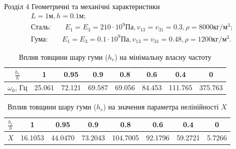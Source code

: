 \documentclass[8pt]{beamer}
\numberwithin{figure}{section}
\numberwithin{equation}{section}
\numberwithin{table}{section}
\begin{document}
\begin{frame}{Розділ 4}
Геометричні та механічні характеристики
\begin{equation}
\begin{gathered}
L=1\text{м}, h=0.1\text{м};\\
\text{Сталь:}\qquad
E_1=E_3=210\cdot 10^{9} Па, v_{13}=v_{31}=0.3, \rho=8000 кг/м^3;\\
\text{Гума:}\qquad
E_1=E_3=0.1\cdot 10^{9} Па, v_{13}=v_{31}=0.48, \rho=1200 кг/м^3.
\end{gathered}
\end{equation}

\begin{table}[h!]
\caption{Вплив товщини шару гуми ($h_{r}$) на мінімальну власну частоту}
\centering
 \begin{tabular}{| c | c | c | c | c | c | c | c |} 
 \hline
 $\displaystyle \frac{h_{r}}{h}$ & 1 & 0.95 & 0.9 & 0.8 & 0.6 & 0.4 & 0 \\ 
  \hline
 $\omega_0$, Гц & 25.061 & 72.121 & 69.587 & 69.056 & 84.453 & 111.765 & 375.763 \\
   \hline
\end{tabular}
\end{table}

\begin{table}[h!]
\caption{Вплив товщини шару гуми ($h_{r}$) на значення параметра нелінійності $X$}
\centering
 \begin{tabular}{| c | c | c | c | c | c | c | c |} 
 \hline
 $\displaystyle \frac{h_{r}}{h}$ & 1 & 0.95 & 0.9 & 0.8 & 0.6 & 0.4 & 0 \\ 
  \hline
 $X$ & 16.1053 & 44.0470 & 73.2043 & 104.7005 & 92.1796 & 59.2721 & 5.7266 \\
   \hline
\end{tabular}
\end{table}

\end{frame}
\end{document}
